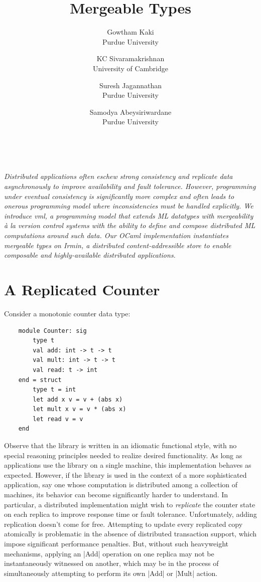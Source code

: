 \documentclass[twocolumn,9pt]{extarticle}
\title{Mergeable Types}
\author{Gowtham Kaki \\
        Purdue University
        \and
				KC Sivaramakrishnan \\
        University of Cambridge
				\and
				Suresh Jagannathan \\
				Purdue University
				\and
				Samodya Abeysiriwardane \\
				Purdue University}
\date{~}
\newcommand{\name}{{\sc vml}\xspace}
\begin{document}
\maketitle

\emph{
	Distributed applications often eschew strong consistency and replicate data
	asynchronously to improve availability and fault tolerance. However,
	programming under eventual consistency is significantly more complex and
	often leads to onerous programming model where inconsistencies must be
	handled explicitly. We introduce \name, a programming model that extends ML
	datatypes with mergeability \`{a} la version control systems with the ability
	to define and compose distributed ML computations around such data. Our OCaml
	implementation instantiates mergeable types on Irmin, a distributed
	content-addressible store to enable composable and highly-available
	distributed applications.
}

\section{A Replicated Counter}

Consider a monotonic counter data type:

\begin{lstlisting}
	module Counter: sig
		type t
		val add: int -> t -> t
		val mult: int -> t -> t
		val read: t -> int
	end = struct
		type t = int
		let add x v = v + (abs x)
		let mult x v = v * (abs x)
		let read v = v
	end
\end{lstlisting}

Observe that the library is written in an idiomatic functional style, with no
special reasoning principles needed to realize desired functionality. As long
as applications use the library on a single machine, this implementation
behaves as expected.  However, if the library is used in the context of a more
sophisticated application, say one whose computation is distributed among a
collection of machines, its behavior can become significantly harder to
understand.  In particular, a distributed implementation might wish to
\emph{replicate} the counter state on each replica to improve response time or
fault tolerance.  Unfortunately, adding replication doesn't come for free.
Attempting to update every replicated copy atomically is problematic in the
absence of distributed transaction support, which impose significant
performance penalties.  But, without such heavyweight mechanisms, applying an
|Add| operation on one replica may not be instantaneously witnessed on another,
which may be in the process of simultaneously attempting to perform its own
|Add| or |Mult| action.
\end{document}

